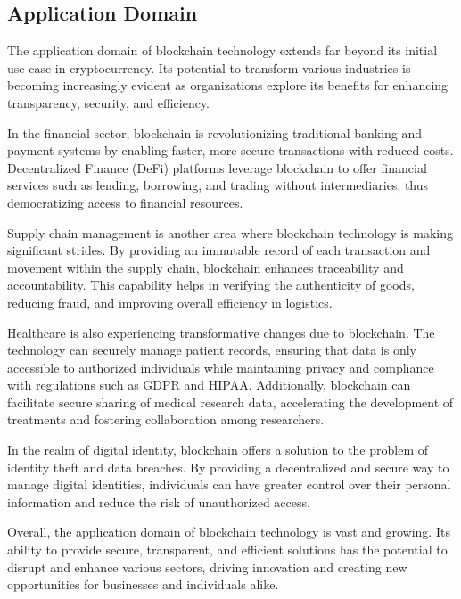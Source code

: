 \documentclass[../main.tex]{subfiles}
\begin{document}
\subsection{Application Domain}

The application domain of blockchain technology extends far beyond its initial use case in cryptocurrency. Its potential to transform various industries is becoming increasingly evident as organizations explore its benefits for enhancing transparency, security, and efficiency.

In the financial sector, blockchain is revolutionizing traditional banking and payment systems by enabling faster, more secure transactions with reduced costs. Decentralized Finance (DeFi) platforms leverage blockchain to offer financial services such as lending, borrowing, and trading without intermediaries, thus democratizing access to financial resources.

Supply chain management is another area where blockchain technology is making significant strides. By providing an immutable record of each transaction and movement within the supply chain, blockchain enhances traceability and accountability. This capability helps in verifying the authenticity of goods, reducing fraud, and improving overall efficiency in logistics.

Healthcare is also experiencing transformative changes due to blockchain. The technology can securely manage patient records, ensuring that data is only accessible to authorized individuals while maintaining privacy and compliance with regulations such as GDPR and HIPAA. Additionally, blockchain can facilitate secure sharing of medical research data, accelerating the development of treatments and fostering collaboration among researchers.

In the realm of digital identity, blockchain offers a solution to the problem of identity theft and data breaches. By providing a decentralized and secure way to manage digital identities, individuals can have greater control over their personal information and reduce the risk of unauthorized access.

Overall, the application domain of blockchain technology is vast and growing. Its ability to provide secure, transparent, and efficient solutions has the potential to disrupt and enhance various sectors, driving innovation and creating new opportunities for businesses and individuals alike.
\end{document}
